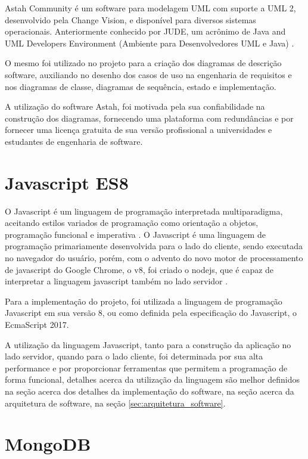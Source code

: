 Astah Community é um software para modelagem UML com suporte a UML 2, desenvolvido pela Change Vision, e disponível para diversos sistemas operacionais. Anteriormente conhecido por JUDE, um acrônimo de Java and UML Developers Environment (Ambiente para Desenvolvedores UML e Java) \cite{astah_uml}.

O mesmo foi utilizado no projeto para a criação dos diagramas de descrição software, auxiliando no desenho dos casos de uso na engenharia de requisitos e nos diagramas de classe, diagramas de sequência, estado e implementação.

A utilização do software Astah, foi motivada pela sua confiabilidade na construção dos diagramas, fornecendo uma plataforma com redundâncias e por fornecer uma licença gratuita de sua versão profissional a universidades e estudantes de engenharia de software.

\section{Javascript ES8}

O Javascript é um linguagem de programação interpretada multiparadigma, aceitando estilos variados de programação como orientação a objetos, programação funcional e imperativa \cite{mozilla_javascript}. O Javascript é uma linguagem de programação primariamente desenvolvida para o lado do cliente, sendo executada no navegador do usuário, porém, com o advento do novo motor de processamento de javascript do Google Chrome, o v8, foi criado o nodejs, que é capaz de interpretar a linguagem javascript também no lado servidor \cite{nodejs_about}.

Para a implementação do projeto, foi utilizada a linguagem de programação Javascript em sua versão 8, ou como definida pela especificação do Javascript, o EcmaScript 2017.

A utilização da linguagem Javascript, tanto para a construção da aplicação no lado servidor, quando para o lado cliente, foi determinada por sua alta performance e por proporcionar ferramentas que permitem a programação de forma funcional, detalhes acerca da utilização da linguagem são melhor definidos na seção acerca dos detalhes da implementação do software, na seção acerca da arquitetura de software, na seção \ref{sec:arquitetura_software}.

\section{MongoDB}

